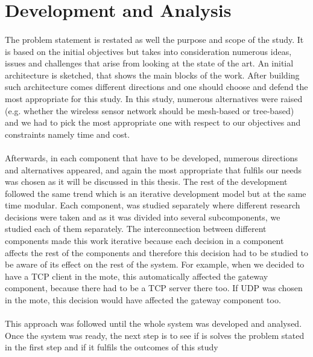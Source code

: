 \documentclass[12pt,a4paper,final]{report}
\begin{document}
\section{Development and Analysis}
\paragraph{}
The problem statement is restated as well the purpose and scope of the study. It is based on the initial objectives but takes into consideration numerous ideas, issues and challenges that arise from looking at the state of the art.
An initial architecture is sketched, that shows the main blocks of the work. After building such architecture comes different directions and one should choose and defend the most appropriate for this study. In this study, numerous alternatives were raised (e.g. whether the wireless sensor network should be mesh-based or tree-based) and we had to pick the most appropriate one with respect to our objectives and constraints namely time and cost.
\paragraph{}
Afterwards, in each component that have to be developed, numerous directions and alternatives appeared, and again the most appropriate that fulfils our needs was chosen as it will be discussed in this thesis. The rest of the development followed the same trend which is an iterative development model but at the same time modular. Each component, was studied separately where different research decisions were taken and as it was divided into several subcomponents, we studied each of them separately. The interconnection between different components made this work iterative because each decision in a component affects the rest of the components and therefore this decision had to be studied to be aware of its effect on the rest of the system. For example, when we decided to have a TCP client in the mote, this automatically affected the gateway component, because there had to be a TCP server there too. If UDP was chosen in the mote, this decision would have affected the gateway component too.
\paragraph{}
This approach was followed until the whole system was developed and analysed. Once the system was ready, the next step is to see if is solves the problem stated in the first step and if it fulfils the outcomes of this study
\end{document}
